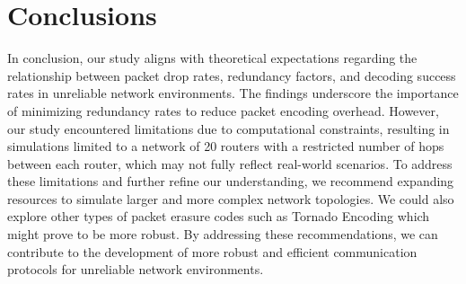 \section{Conclusions}
\label{sec:concl}
In conclusion, our study aligns with theoretical expectations regarding the relationship between packet drop rates, redundancy factors, and decoding success rates in unreliable network environments. The findings underscore the importance of minimizing redundancy rates to reduce packet encoding overhead. However, our study encountered limitations due to computational constraints, resulting in simulations limited to a network of 20 routers with a restricted number of hops between each router, which may not fully reflect real-world scenarios. To address these limitations and further refine our understanding, we recommend expanding resources to simulate larger and more complex network topologies. We could also explore other types of packet erasure codes such as Tornado Encoding which might prove to be more robust. By addressing these recommendations, we can contribute to the development of more robust and efficient communication protocols for unreliable network environments.
